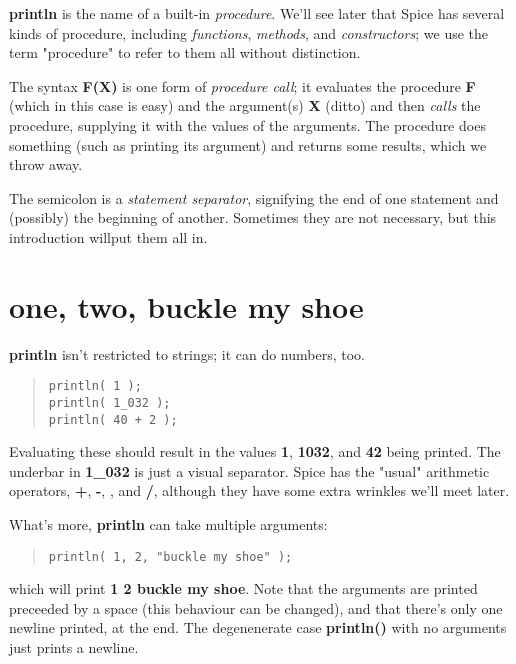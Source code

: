 \documentclass{report}
\begin{document}
{\bf println} is the name of a built-in {\em procedure}. We'll see later that Spice
has several kinds of procedure, including {\em functions}, {\em methods}, and
{\em constructors}; we use the term "procedure" to refer to them all without
distinction.

The syntax {\bf F(X)} is one form of {\em procedure call}; it evaluates the procedure
{\bf F} (which in this case is easy) and the argument(s) {\bf X} (ditto) and then
{\em calls} the procedure, supplying it with the values of the arguments. The
procedure does something (such as printing its argument) and returns some
results, which we throw away.

The semicolon is a {\em statement separator}, signifying the end of one statement
and (possibly) the beginning of another. Sometimes they are not necessary, but
this introduction willput them all in.

\section{one, two, buckle my shoe}


{\bf println} isn't restricted to strings; it can do numbers, too.

\begin{quote}
\begin{verbatim}
println( 1 );
println( 1_032 );
println( 40 + 2 );
\end{verbatim}
\end{quote}


Evaluating these should result in the values {\bf 1}, {\bf 1032}, and {\bf 42} being
printed. The underbar in {\bf 1\_032} is just a visual separator. Spice has the
"usual" arithmetic operators, {\bf +}, {\bf -}, {\bf *}, and {\bf /}, although they have some
extra wrinkles we'll meet later.

What's more, {\bf println} can take multiple arguments:

\begin{quote}
\begin{verbatim}
println( 1, 2, "buckle my shoe" );
\end{verbatim}
\end{quote}


which will print {\bf 1 2 buckle my shoe}. Note that the arguments are printed
preceeded by a space (this behaviour can be changed), and that there's
only one newline printed, at the end. The degenenerate case {\bf println()} with
no arguments just prints a newline.
\end{document}
